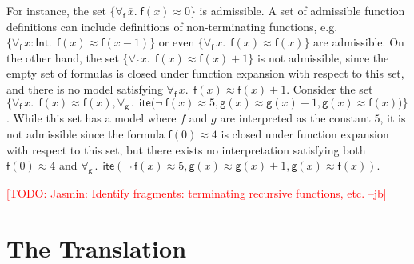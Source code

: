 \documentclass[runningheads,a4paper]{llncs}
\newcommand{\con}[1]{\mathsf{#1}}
\renewcommand\vec[1]{\overline{#1}}
\let\oldneg=\neg
\def\neg{\oldneg\:}
\newcommand{\teq}{\approx}
\newcommand{\sortint}{\ty{Int}}
\newcommand\ty[1]{\con{#1}}
\newcommand{\lite}{\con{ite}}
\newcommand{\forallf}[1]{\forall_{\!#1\:}}
\newcommand{\rem}[1]{\textcolor{red}{[#1]}}
\newcommand{\jb}[1]{\rem{#1 --jb}}
\begin{document}
For instance, the set $\{ \forallf{\con{f}} \vec x.\; \con{f}( x ) \teq 0 \}$ is admissible.
A set of admissible function definitions can include definitions of non-terminating functions, e.g.
$\{ \forallf{\con{f}} x : \sortint.\;\, \con{f}( x ) \teq \con{f}( x - 1 ) \}$ or even $\{ \forallf{\con{f}} x.\;\, \con{f}( x ) \teq \con{f}( x ) \}$ are admissible.
On the other hand, the set $\{ \forallf{\con{f}} x.\;\, \con{f}( x ) \teq \con{f}( x ) + 1 \}$ is not admissible, 
since the empty set of formulas is closed under function expansion with respect to this set,
and there is no model satisfying $\forallf{\con{f}} x.\;\, \con{f}( x ) \teq \con{f}( x ) + 1$.
Consider the set $\{ \forallf{\con{f}} x.\;\, \con{f}( x ) \teq \con{f}( x ), \forallf{\con{g}}.\;\, \lite\bigl( \neg \con{f}( x ) \teq 5, \con{g}( x ) \teq \con{g}( x ) + 1, \con{g}( x ) \teq \con{f}( x ) \bigr) \}$.
While this set has a model where $f$ and $g$ are interpreted as the constant $5$, it is not admissible
since the formula $\con{f}( 0 ) \teq 4$ is closed under function expansion with respect to this set,
but there exists no interpretation satisfying both $\con{f}( 0 ) \teq 4$ and $\forallf{\con{g}}.\;\, \lite( \neg \con{f}( x ) \teq 5, \con{g}( x ) \teq \con{g}( x ) + 1, \con{g}( x ) \teq \con{f}( x ) )$.


\jb{TODO: Jasmin: Identify fragments: terminating recursive functions, etc.}


\section{The Translation}
\label{sec:encoding}
\end{document}
